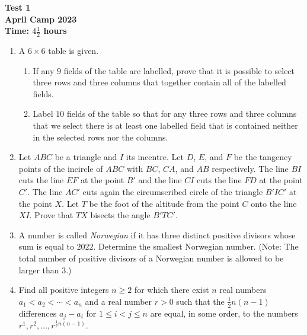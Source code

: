 \documentclass{article}
\begin{document}
\thispagestyle{empty}

\begin{center}
  \textbf{\Large Test 1}
  \\ \vspace{1em}
  \textbf{\large April Camp 2023}
  \\ \vspace{1em}
  \textbf{\large Time: $4\frac{1}{2}$ hours}
\end{center}

\bigskip
\vfill


\begin{enumerate}[itemsep=\fill]


\item %
A $6 \times 6$ table is given.
\begin{enumerate}
  \item If any $9$ fields of the table are labelled, prove that it is possible to select three rows and three columns that together contain all of the labelled fields.
  \item Label $10$ fields of the table so that for any three rows and three columns that we select there is at least one labelled field that is contained neither in the selected rows nor the columns.
\end{enumerate}


\item %
Let $ABC$ be a triangle and $I$ its incentre.
Let $D$, $E$, and $F$ be the tangency points of the incircle of $ABC$ with $BC$, $CA$, and $AB$ respectively.
The line $BI$ cuts the line $EF$ at the point $B'$ and the line $CI$ cuts the line $FD$ at the point $C'$.
The line $AC'$ cuts again the circumscribed circle of the triangle $B'IC'$ at the point $X$.
Let $T$ be the foot of the altitude from the point $C$ onto the line $XI$.
Prove that $TX$ bisects the angle $B'TC'$.


\item %
A number is called \emph{Norwegian} if it has three distinct positive divisors whose sum is equal to $2022$.
Determine the smallest Norwegian number.
(Note: The total number of positive divisors of a Norwegian number is allowed to be larger than $3$.)


\item %
Find all positive integers $n \geq 2$ for which there exist $n$ real numbers $a_1 < a_2 < \dotsb < a_n$ and a real number $r > 0$ such that the $\frac{1}{2}n(n-1)$ differences $a_j-a_i$ for $1 \leq i < j \leq n$ are equal, in some order, to the numbers $r^1, r^2, \dotsc, r^{\frac{1}{2}n(n-1)}$.


\end{enumerate}
\end{document}
